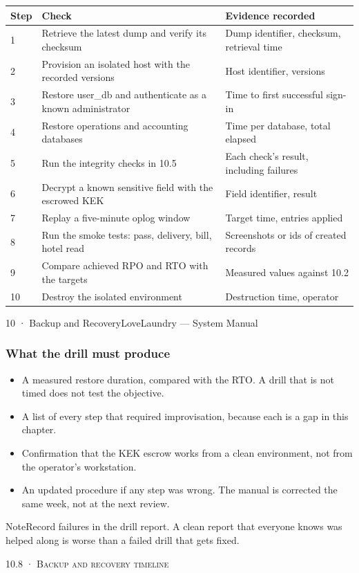 \documentclass[11pt,a4paper,oneside]{book}
\begin{document}
\begin{center}\small
\begin{tabularx}{\linewidth}{|X|X|X|}
\hline
\rowcolor{lightgrey}
\textbf{Step} & \textbf{Check} & \textbf{Evidence recorded} \\ \hline
1 & Retrieve the latest dump and verify its checksum & Dump identifier, checksum, retrieval time \\ \hline
2 & Provision an isolated host with the recorded versions & Host identifier, versions \\ \hline
3 & Restore user\_db and authenticate as a known administrator & Time to first successful sign-in \\ \hline
4 & Restore operations and accounting databases & Time per database, total elapsed \\ \hline
5 & Run the integrity checks in 10.5 & Each check's result, including failures \\ \hline
6 & Decrypt a known sensitive field with the escrowed KEK & Field identifier, result \\ \hline
7 & Replay a five-minute oplog window & Target time, entries applied \\ \hline
8 & Run the smoke tests: pass, delivery, bill, hotel read & Screenshots or ids of created records \\ \hline
9 & Compare achieved RPO and RTO with the targets & Measured values against 10.2 \\ \hline
10 & Destroy the isolated environment & Destruction time, operator \\ \hline
\end{tabularx}
\end{center}
10 · Backup and RecoveryLoveLaundry — System Manual

\subsubsection*{What the drill must produce}
\begin{itemize}
\item A measured restore duration, compared with the RTO. A drill that is not timed does not test the objective.
\item A list of every step that required improvisation, because each is a gap in this chapter.
\item Confirmation that the KEK escrow works from a clean environment, not from the operator's workstation.
\item An updated procedure if any step was wrong. The manual is corrected the same week, not at the next review.
\end{itemize}
\begin{notebox}NoteRecord failures in the drill report. A clean report that everyone knows was helped along is worse than a failed drill that gets fixed.\end{notebox}
\textsc{\small\color{crimson}10.8 · Backup and recovery timeline}\par\medskip
\end{document}
